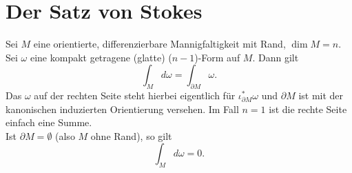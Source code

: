 \chapter{Der Satz von Stokes}

\begin{thm}\autolabel
	Sei $M$ eine orientierte, differenzierbare Mannigfaltigkeit mit Rand, $\dim M = n$. Sei $\omega$ eine kompakt getragene (glatte) ($n-1$)-Form auf $M$. Dann gilt
	\[ \int_M d\omega = \int_{\partial M} \omega. \]
	Das $\omega$ auf der rechten Seite steht hierbei eigentlich für $\iota_{\partial M}^*\omega$ und $\partial M$ ist mit der kanonischen induzierten Orientierung versehen. Im Fall $n=1$ ist die rechte Seite einfach eine Summe.\\
	Ist $\partial M = \emptyset$ (also $M$ ohne Rand), so gilt
	\[ \int_M d\omega = 0. \]
\end{thm}

